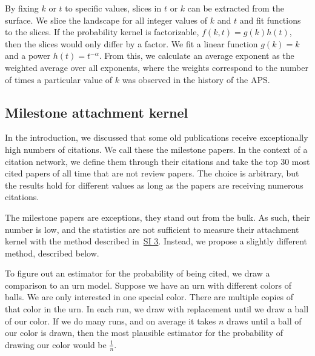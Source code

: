 \documentclass[draft,final]{vutinfth} %
\begin{document}
By fixing $k$ or $t$ to specific values, slices in $t$ or $k$ can be extracted from the surface. We slice the landscape for all integer values of $k$ and $t$ and fit functions to the slices. If the probability kernel is factorizable, $f(k, t)=g(k)h(t)$, then the slices would only differ by a factor. We fit a linear function $g(k) = k$ and a power $h(t) = t^{-\alpha}$. From this, we calculate an average exponent as the weighted average over all exponents, where the weights correspond to the number of times a particular value of $k$ was observed in the history of the APS.

\subsection{Milestone attachment kernel}
\label{SIM4}

In the introduction, we discussed that some old publications receive exceptionally high numbers of citations. We call these the milestone papers. In the context of a citation network, we define them through their citations and take the top 30 most cited papers of all time that are not review papers. The choice is arbitrary, but the results hold for different values as long as the papers are receiving numerous citations. 

The milestone papers are exceptions, they stand out from the bulk. As such, their number is low, and the statistics are not sufficient to measure their attachment kernel with the method described in~\hyperref[SI3]{SI 3}. Instead, we propose a slightly different method, described below. 

To figure out an estimator for the probability of being cited, we draw a comparison to an urn model. Suppose we have an urn with different colors of balls. We are only interested in one special color. There are multiple copies of that color in the urn. In each run, we draw with replacement until we draw a ball of our color. If we do many runs, and on average it takes $n$ draws until a ball of our color is drawn, then the most plausible estimator for the probability of drawing our color would be $\frac{1}{n}$.
\end{document}
